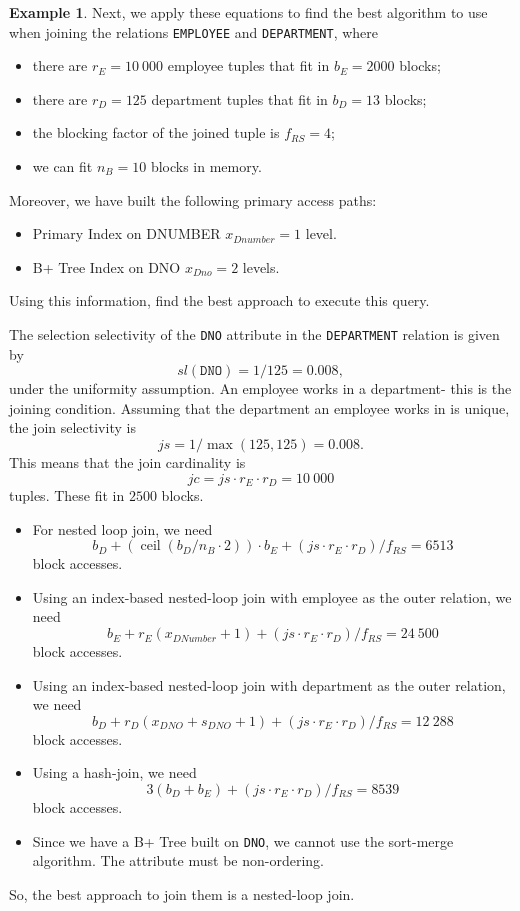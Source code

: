\documentclass[a4paper, openany]{memoir}
\theoremstyle{definition}
\newtheorem{example}[subsection]{Example}
\begin{document}
\newpage

\begin{example}
    Next, we apply these equations to find the best algorithm to use when joining the relations \texttt{EMPLOYEE} and \texttt{DEPARTMENT}, where
    \begin{itemize}
        \item there are $r_E = 10 \ 000$ employee tuples that fit in $b_E = 2000$ blocks;
        \item there are $r_D = 125$ department tuples that fit in $b_D = 13$ blocks;
        \item the blocking factor of the joined tuple is $f_{RS} = 4$;
        \item we can fit $n_B = 10$ blocks in memory.
    \end{itemize}
    Moreover, we have built the following primary access paths:
    \begin{itemize}
        \item Primary Index on DNUMBER $x_{Dnumber} = 1$ level.
        \item B+ Tree Index on DNO $x_{Dno} = 2$ levels.
    \end{itemize}
    Using this information, find the best approach to execute this query.
\end{example}
\begin{answer}
    The selection selectivity of the \texttt{DNO} attribute in the \texttt{DEPARTMENT} relation is given by
    \[\textit{sl}(\texttt{DNO}) = 1/125 = 0.008,\]
    under the uniformity assumption. An employee works in a department- this is the joining condition. Assuming that the department an employee works in is unique, the join selectivity is
    \[\textit{js} = 1/\max(125, 125) = 0.008.\]
    This means that the join cardinality is
    \[\textit{jc} = \textit{js} \cdot r_E \cdot r_D = 10 \ 000\]
    tuples. These fit in $2500$ blocks.
    \begin{itemize}
        \item For nested loop join, we need
        \[b_D + (\operatorname{ceil}(b_D / n_B \cdot 2)) \cdot b_E + (\textit{js} \cdot r_E \cdot r_D)/f_{RS} = 6513\]
        block accesses.
        \item Using an index-based nested-loop join with employee as the outer relation, we need
        \[b_E + r_E (x_{DNumber} + 1) + (\textit{js} \cdot r_E \cdot r_D)/f_{RS} = 24 \ 500\]
        block accesses.
        \item Using an index-based nested-loop join with department as the outer relation, we need
        \[b_D + r_D (x_{DNO} + s_{DNO} + 1) + (\textit{js} \cdot r_E \cdot r_D)/f_{RS} = 12 \ 288\]
        block accesses.
        \item Using a hash-join, we need
        \[3(b_D + b_E) + (\textit{js} \cdot r_E \cdot r_D)/f_{RS} = 8539\]
        block accesses.
        \item Since we have a B+ Tree built on \texttt{DNO}, we cannot use the sort-merge algorithm. The attribute must be non-ordering.
    \end{itemize}
    So, the best approach to join them is a nested-loop join.
\end{answer}
\newpage
\end{document}
